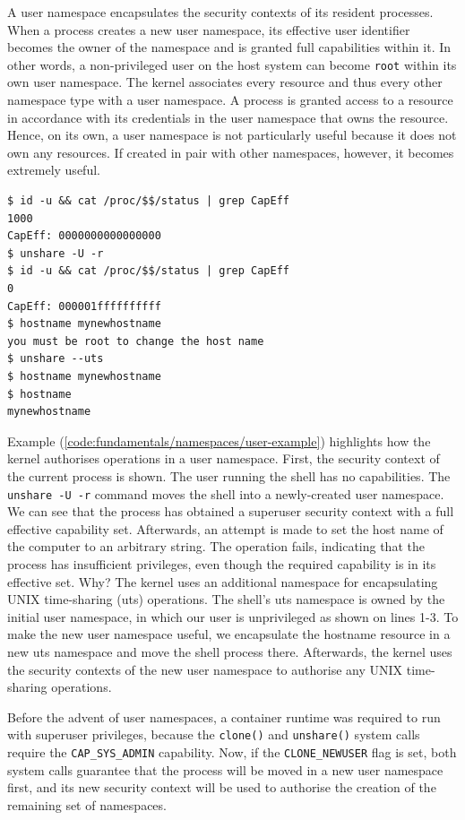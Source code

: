 A user namespace encapsulates the security contexts of its resident processes. 
When a process creates a new user namespace, its effective user identifier
becomes the owner of the namespace and is granted full capabilities within it.
In other words, a non-privileged user on the host system can become \verb|root| within its own 
user namespace.
The kernel associates every resource and thus every other namespace type 
with a user namespace. A process is granted access to a resource in accordance with its 
credentials in the user namespace that owns the resource. 
Hence, on its own, a user namespace is not particularly useful because it does not 
own any resources. If created in pair with other namespaces, however, it becomes 
extremely useful.
\begin{lstlisting}[label={code:fundamentals/namespaces/user-example}, style=bash, caption={Example of resource ownership semantics with user namespaces}]
$ id -u && cat /proc/$$/status | grep CapEff
1000
CapEff:	0000000000000000
$ unshare -U -r  
$ id -u && cat /proc/$$/status | grep CapEff
0
CapEff:	000001ffffffffff
$ hostname mynewhostname
you must be root to change the host name
$ unshare --uts
$ hostname mynewhostname
$ hostname 
mynewhostname 
\end{lstlisting}
Example (\ref{code:fundamentals/namespaces/user-example}) highlights how the kernel authorises operations in a user namespace.
First, the security context of the current process is shown. The user running the shell has no capabilities. 
The \verb|unshare -U -r| command moves the shell into a newly-created user namespace. 
We can see that the process has obtained a superuser security context with a full effective 
capability set. Afterwards, an attempt is made to set the host name of the computer to an arbitrary string.
The operation fails, indicating that the process has insufficient privileges, even though the required 
capability is in its effective set. Why? The kernel uses an additional namespace for 
encapsulating UNIX time-sharing (uts) operations. The shell's uts namespace is owned by 
the initial user namespace, in which our user is unprivileged as shown on lines 1-3. 
To make the new user namespace useful, we encapsulate the hostname resource in a new uts namespace 
and move the shell process there. Afterwards, the kernel uses the security contexts of the new  
user namespace to authorise any UNIX time-sharing operations.

Before the advent of user namespaces,
a container runtime was required to run with superuser privileges,  
because the \verb|clone()| and \verb|unshare()| system calls require the \verb|CAP_SYS_ADMIN| 
capability. Now, if the \verb|CLONE_NEWUSER| flag is set, both system calls guarantee that the 
process will be moved in a new user namespace first, and its new security context will be used 
to authorise the creation of the remaining set of namespaces.

